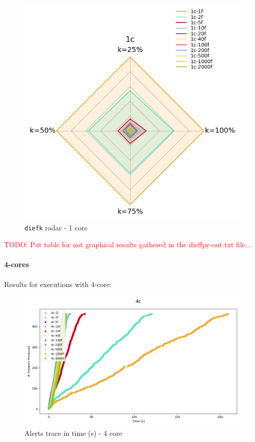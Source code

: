 \begin{figure}[H]
  \centering
  \includegraphics[scale = 0.5]{images/4-Experiments/E2/fixedcores/1c/radar-diefk.png}
  \caption{\texttt{diefk} radar - 1 core}
\end{figure}

\textcolor{red}{TODO: Put table for not graphical results gathered in the dieffpy-out.txt file...}

\paragraph{4-cores\\}

Results for executions with 4-core:

\begin{figure}[H]
  \centering
  \includegraphics[scale = 0.5]{images/4-Experiments/E2/fixedcores/4c/traces.png}
  \caption{Alerts trace in time (s) - 4 core}
\end{figure}

